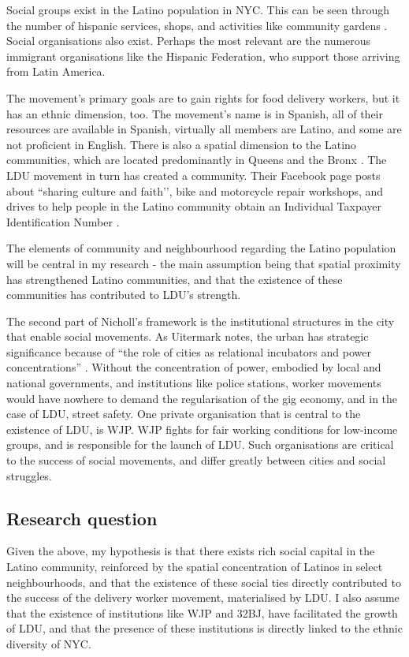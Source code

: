 \documentclass{article}[12pt]
\begin{document}
Social groups exist in the Latino population in NYC. This can be seen through the number of hispanic services, shops, and activities like community gardens \parencite{saldivar2004culturing}. Social organisations also exist. Perhaps the most relevant are the numerous immigrant organisations like the Hispanic Federation, who support those arriving from Latin America. 

The movement’s primary goals are to gain rights for food delivery workers, but it has an ethnic dimension, too. The movement’s name is in Spanish, all of their resources are available in Spanish, virtually all members are Latino, and some are not proficient in English. There is also a spatial dimension to the Latino communities, which are located predominantly in Queens and the Bronx \parencite{nycimmigrantpopulation2021}. The LDU movement in turn has created a community. Their Facebook page posts about ``sharing culture and faith’’, bike and motorcycle repair workshops, and drives to help people in the Latino community obtain an Individual Taxpayer Identification Number \parencite{facebookldu}.

The elements of community and neighbourhood regarding the Latino population will be central in my research - the main assumption being that spatial proximity has strengthened Latino communities, and that the existence of these communities has contributed to LDU’s strength.

The second part of Nicholl's framework is the institutional structures in the city that enable social movements. As Uitermark notes, the urban has strategic significance because of ``the role of cities as relational incubators and power concentrations'' \parencite{uitermark2012cities}. Without the concentration of power, embodied by local and national governments, and institutions like police stations, worker movements would have nowhere to demand the regularisation of the gig economy, and in the case of LDU, street safety. One private organisation that is central to the existence of LDU, is WJP. WJP fights for fair working conditions for low-income groups, and is responsible for the launch of LDU. Such organisations are critical to the success of social movements, and differ greatly between cities and social struggles.

\subsection{Research question}

Given the above, my hypothesis is that there exists rich social capital in the Latino community, reinforced by the spatial concentration of Latinos in select neighbourhoods, and that the existence of these social ties directly contributed to the success of the delivery worker movement, materialised by LDU. 
I also assume that the existence of institutions like WJP and 32BJ, have facilitated the growth of LDU, and that the presence of these institutions is directly linked to the ethnic diversity of NYC.
\end{document}
